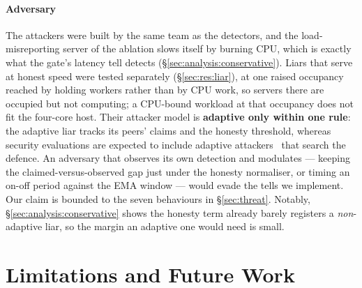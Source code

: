\documentclass[10pt,twocolumn,letterpaper]{article}
\begin{document}
\paragraph*{Adversary}
The attackers were built by the same team as the detectors, and the
load-misreporting server of the ablation slows itself by burning CPU, which is
exactly what the gate's latency tell detects (\S\ref{sec:analysis:conservative}).
Liars that serve at honest speed were tested separately (\S\ref{sec:res:liar}),
at one raised occupancy reached by holding workers rather than by CPU work, so
servers there are occupied but not computing; a CPU-bound workload at that
occupancy does not fit the four-core host. Their attacker model is
\textbf{adaptive only within one rule}: the adaptive liar tracks its peers' claims
and the honesty threshold, whereas security evaluations are
expected to include adaptive attackers~\cite{carlini2019evaluating,tramer2020adaptive}
that search the defence. An adversary that
observes its own detection and modulates --- keeping the claimed-versus-observed
gap just under the honesty normaliser, or timing an on-off period against the
EMA window --- would evade the tells we implement. Our claim is bounded to the
seven behaviours in \S\ref{sec:threat}. Notably,
\S\ref{sec:analysis:conservative} shows the honesty term already barely
registers a \emph{non}-adaptive liar, so the margin an adaptive one would need
is small.

\section{Limitations and Future Work}
\label{sec:limits}
\end{document}
